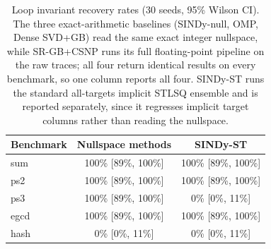 \documentclass{article}
\begin{document}
\begin{table}[ht]
\centering
\caption{Loop invariant recovery rates (30 seeds, 95\% Wilson CI). The three exact-arithmetic baselines (SINDy-null, OMP, Dense SVD+GB) read the same exact integer nullspace, while SR-GB+CSNP runs its full floating-point pipeline on the raw traces; all four return identical results on every benchmark, so one column reports all four. SINDy-ST runs the standard all-targets implicit STLSQ ensemble and is reported separately, since it regresses implicit target columns rather than reading the nullspace.}
\label{tab:loop-invariants}
\begin{tabular}{lcc}
\toprule
\textbf{Benchmark} & \textbf{Nullspace methods} & \textbf{SINDy-ST}\\
\midrule
sum & 100\% [89\%, 100\%] & 100\% [89\%, 100\%]\\
ps2 & 100\% [89\%, 100\%] & 100\% [89\%, 100\%]\\
ps3 & 100\% [89\%, 100\%] & 0\% [0\%, 11\%]\\
egcd & 100\% [89\%, 100\%] & 100\% [89\%, 100\%]\\
hash & 0\% [0\%, 11\%] & 0\% [0\%, 11\%]\\
\bottomrule
\end{tabular}
\end{table}
\end{document}
